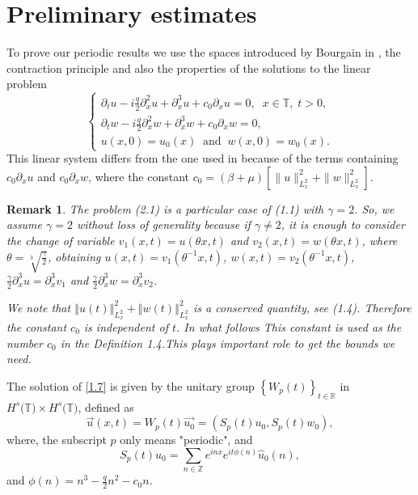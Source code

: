 \documentclass[reqno]{amsart}
\newtheorem{remark}[theorem]{Remark}
\numberwithin{equation}{section}
\begin{document}
\section{Preliminary estimates}

To prove our periodic results we use the spaces introduced by Bourgain  in
\cite{4}, the contraction principle and also the properties of the
solutions to the linear problem
\begin{equation}\label{1.7}
\begin{cases}
\partial_{t}u-i\frac{q}{2}\partial_{x}^{2}u+\partial_{x}^{3}u+c_{0}\partial_{x}u=0,
\;\;x\in\mathbb{T}, \;t>0,\\
\partial_{t}w-i\frac{q}{2}\partial_{x}^{2}w+\partial_{x}^{3}w+c_{0}\partial_{x}w=0,\\
u(x,0)=u_0(x)\;\;\text{and}\;\;w(x,0)=w_0(x).
\end{cases}
\end{equation}
This linear system differs from the one used in \cite{4a} because
of the terms containing $c_{0}\partial_{x}u$ and
$c_{0}\partial_{x}w$, where the constant $c_{0}=\left(
\beta+\mu\right) [\| u\| _{L_{x}^{2}}^{2}+\| w\|
_{L_{x}^{2}}^{2}]$.

\begin{remark}
The problem (2.1) is a particular case of (1.1) with $\gamma=2$.
So, we assume  $\gamma=2$ without loss of generality because if
$\gamma\neq2$, it is enough to consider the change of variable
$v_{1} (x,t)=u(\theta x,t)$ and $v_{2}(x,t)=w(\theta x,t)$, where
$\theta=\sqrt[3] {\frac{\gamma}{2}}$, obtaining
$u(x,t)=v_{1}(\theta^{-1}x,t)$, $w(x,t)=v_{2} (\theta^{-1}x,t)$,
$\frac{\gamma}{2}\partial_{x}^{3}u=\partial_{x}^{3}v_{1}$ and
$\frac{\gamma}{2}\partial_{x}^{3}w=\partial_{x}^{3}v_{2}$.

We note that $\left\Vert u(t)\right\Vert _{L_{x}^{2}}
^{2}+\left\Vert w(t)\right\Vert _{L_{x}^{2}}^{2}$ is a conserved
quantity, see (1.4). Therefore the constant $c_{0}$ is independent
of $t$. In what follows  This constant is used as the number $c_0$
in the Definition 1.4.This plays important role to get the bounds
we need.

\end{remark}

The solution of \eqref{1.7} is given by the unitary group
$\left\{  W_{p}(t)\right\}  _{t\in\mathbb{R}}$ in $H^{s}(\mathbb{T)\times}H^{s}(\mathbb{T)}$,
defined as
\begin{equation}\label{1.8}
\overrightarrow{u}(x,t)=W_{p}(t)\overrightarrow{u_0}=(S_{p}(t)u_{0},S_{p}(t)w_{0}),
\end{equation}
where, the subscript $p$ only means "periodic", and
\begin{equation*}
S_{p}(t)u_{0}=\sum\limits_{n\in\mathbb{Z}}e^{inx}e^{it\phi(n)}\widehat{u}_{0}\left(  n\right),
\end{equation*}
and $\phi(n)=n^{3}-\frac{q}{2}n^{2}-c_{0}n$.
\end{document}
